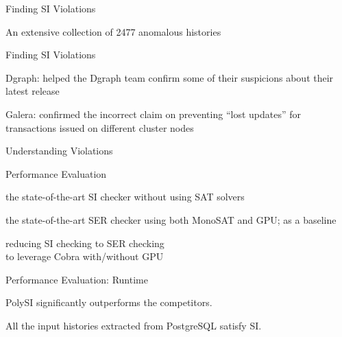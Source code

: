 \begin{frame}{Finding SI Violations}
	\begin{center}
		{}
		\vspace{0.60cm}

		An extensive collection of 2477 anomalous histories \\[2pt]
	\end{center}
\end{frame}

\begin{frame}{Finding SI Violations}
	\begin{center}
		Dgraph: helped the Dgraph team confirm some of their suspicions
		  about their latest release

		\vspace{0.50cm}
		{}
		\vspace{0.50cm}

		Galera: confirmed the incorrect claim on preventing ``lost updates''
		  for transactions issued on different cluster nodes
	\end{center}
\end{frame}

\begin{frame}{Understanding Violations}
\end{frame}

\begin{frame}{Performance Evaluation}
	\begin{description}
		\setlength{\itemsep}{15pt}
		\item[dbcop~\ncite{Complexity:OOPSLA2019}:]
			the state-of-the-art SI checker without using SAT solvers
		\item[Cobra~\ncite{Cobra:OSDI2020}:]
		  the state-of-the-art SER checker using both MonoSAT and GPU;
			as a baseline
		\item[CobraSI:] reducing SI checking to SER checking \\
		   to leverage Cobra with/without GPU
	\end{description}
\end{frame}

\begin{frame}{Performance Evaluation: Runtime}
	\centerline{PolySI significantly outperforms the competitors.}


	\vspace{-0.30cm}
	\centerline{All the input histories extracted from PostgreSQL satisfy SI.}
\end{frame}

